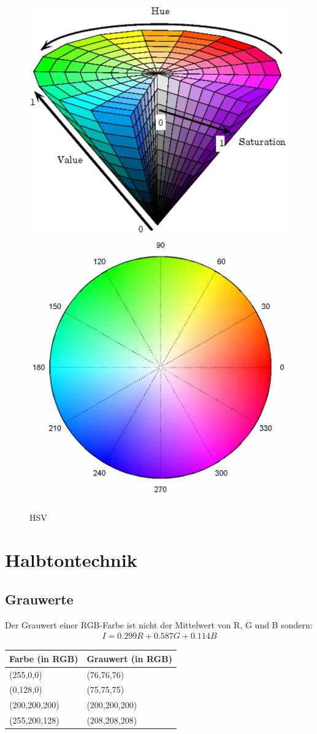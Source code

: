 \begin{figure}[!ht]
\centering
\includegraphics[width=0.4\linewidth]{fig/hsv1}
\includegraphics[width=0.4\linewidth]{fig/hsv2}
\caption{HSV}
\label{fig:hsv}
\end{figure}

\section{Halbtontechnik}
\subsection{Grauwerte}
Der Grauwert einer RGB-Farbe ist nicht der Mittelwert von R, G und B sondern:
\begin{gather*}
I = 0.299R + 0.587G + 0.114B
\end{gather*}
\begin{tabular}{|l|l|}
\hline
\rowcolor[HTML]{000000} 
{\color[HTML]{FFFFFF} \textbf{Farbe (in RGB)}} & {\color[HTML]{FFFFFF} \textbf{Grauwert (in RGB)}} \\ \hline
(255,0,0)                                      & (76,76,76)                                        \\ \hline
(0,128,0)                                      & (75,75,75)                                        \\ \hline
(200,200,200)                                  & (200,200,200)                                     \\ \hline
(255,200,128)                                  & (208,208,208)                                     \\ \hline
\end{tabular}


